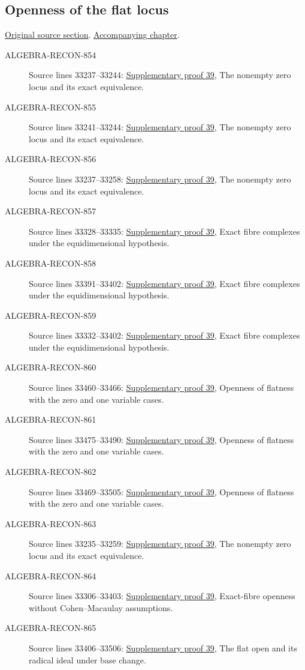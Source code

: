 \subsection{Openness of the flat locus}
\hypertarget{algebra-source-section-open-flat}{}
\noindent\href{https://github.com/stacks/stacks-project/blob/a04446e57ec1fbc252a871afcec7752fb2807b14/algebra.tex\#L33227}{Original source section}. \href{algebra.pdf\#nameddest=section-open-flat}{Accompanying chapter}.

\begin{description}
\item[ALGEBRA-RECON-854] Source lines 33237--33244: \hyperlink{algebra_open_flat_notes_20260928}{Supplementary proof 39}, The nonempty zero locus and its exact equivalence.
\item[ALGEBRA-RECON-855] Source lines 33241--33244: \hyperlink{algebra_open_flat_notes_20260928}{Supplementary proof 39}, The nonempty zero locus and its exact equivalence.
\item[ALGEBRA-RECON-856] Source lines 33237--33258: \hyperlink{algebra_open_flat_notes_20260928}{Supplementary proof 39}, The nonempty zero locus and its exact equivalence.
\item[ALGEBRA-RECON-857] Source lines 33328--33335: \hyperlink{algebra_open_flat_notes_20260928}{Supplementary proof 39}, Exact fibre complexes under the equidimensional hypothesis.
\item[ALGEBRA-RECON-858] Source lines 33391--33402: \hyperlink{algebra_open_flat_notes_20260928}{Supplementary proof 39}, Exact fibre complexes under the equidimensional hypothesis.
\item[ALGEBRA-RECON-859] Source lines 33332--33402: \hyperlink{algebra_open_flat_notes_20260928}{Supplementary proof 39}, Exact fibre complexes under the equidimensional hypothesis.
\item[ALGEBRA-RECON-860] Source lines 33460--33466: \hyperlink{algebra_open_flat_notes_20260928}{Supplementary proof 39}, Openness of flatness with the zero and one variable cases.
\item[ALGEBRA-RECON-861] Source lines 33475--33490: \hyperlink{algebra_open_flat_notes_20260928}{Supplementary proof 39}, Openness of flatness with the zero and one variable cases.
\item[ALGEBRA-RECON-862] Source lines 33469--33505: \hyperlink{algebra_open_flat_notes_20260928}{Supplementary proof 39}, Openness of flatness with the zero and one variable cases.
\item[ALGEBRA-RECON-863] Source lines 33235--33259: \hyperlink{algebra_open_flat_notes_20260928}{Supplementary proof 39}, The nonempty zero locus and its exact equivalence.
\item[ALGEBRA-RECON-864] Source lines 33306--33403: \hyperlink{algebra_open_flat_notes_20260928}{Supplementary proof 39}, Exact-fibre openness without Cohen–Macaulay assumptions.
\item[ALGEBRA-RECON-865] Source lines 33406--33506: \hyperlink{algebra_open_flat_notes_20260928}{Supplementary proof 39}, The flat open and its radical ideal under base change.
\end{description}


